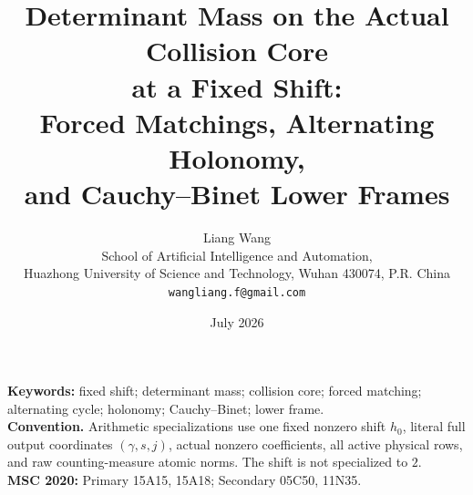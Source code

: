 \documentclass[11pt]{article}
\title{Determinant Mass on the Actual Collision Core\\
at a Fixed Shift:\\
Forced Matchings, Alternating Holonomy,\\
and Cauchy--Binet Lower Frames}
\author{Liang Wang\\
School of Artificial Intelligence and Automation,\\
Huazhong University of Science and Technology, Wuhan 430074, P.R. China\\
\texttt{wangliang.f@gmail.com}}
\date{July 2026}
\theoremstyle{remark}
\begin{document}
\maketitle


\noindent\textbf{Keywords:} fixed shift; determinant mass; collision core;
forced matching; alternating cycle; holonomy; Cauchy--Binet; lower frame.\\[0.5em]
\noindent\textbf{Convention.} Arithmetic specializations use one fixed
nonzero shift \(h_0\), literal full output coordinates
\((\gamma,s,j)\), actual nonzero coefficients, all active physical rows, and
raw counting-measure atomic norms. The shift is not specialized to \(2\).\\[0.5em]
\noindent\textbf{MSC 2020:} Primary 15A15, 15A18; Secondary 05C50, 11N35.










\begingroup
\small
\raggedright


\endgroup
\end{document}
